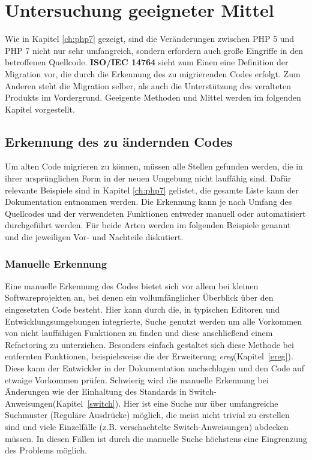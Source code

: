 \chapter{Untersuchung geeigneter Mittel}\label{ch:tools} 

Wie in Kapitel \ref{ch:php7} gezeigt, sind die Veränderungen zwischen \acs{PHP} 5 und \acs{PHP} 7 nicht nur sehr umfangreich, sondern erfordern auch große Eingriffe 
in den betroffenen Quellcode. \textbf{ISO/IEC 14764} sieht zum Einen eine Definition der Migration vor, die durch die Erkennung 
des zu migrierenden Codes erfolgt. Zum Anderen steht die Migration selber, als auch die Unterstützung des veralteten Produkts 
im Vordergrund. Geeigente Methoden und Mittel werden im folgenden Kapitel vorgestellt. 

\section{Erkennung des zu ändernden Codes}
    Um alten Code migrieren zu können, müssen alle Stellen gefunden werden, die in ihrer ursprünglichen Form in der neuen Umgebung nicht lauffähig sind. Dafür relevante
    Beispiele sind in Kapitel \ref{ch:php7} gelistet, die gesamte Liste kann der Dokumentation entnommen werden. Die Erkennung kann je nach Umfang des Quellcodes
    und der verwendeten Funktionen entweder manuell oder automatisiert durchgeführt werden. Für beide Arten werden im folgenden Beispiele genannt und die jeweiligen
    Vor- und Nachteile diskutiert.
    \subsection{Manuelle Erkennung}
        Eine manuelle Erkennung des Codes bietet sich vor allem bei kleinen Softwareprojekten an, bei denen ein vollumfänglicher Überblick über den eingesetzten Code
        besteht. Hier kann durch die, in typischen Editoren und Entwicklungsumgebungen integrierte, Suche genutzt werden um alle Vorkommen von nicht lauffähigen
        Funktionen zu finden und diese anschließend einem Refactoring zu unterziehen. Besonders einfach gestaltet sich diese Methode bei entfernten Funktionen,
        beispielsweise die der Erweiterung \textit{ereg}(Kapitel~\ref{ereg}). Diese kann der Entwickler in der Dokumentation nachschlagen und den Code auf etwaige Vorkommen prüfen.
        Schwierig wird die manuelle Erkennung bei Änderungen wie der Einhaltung des Standards in Switch-Anweisungen(Kapitel~\ref{switch}). Hier ist eine Suche nur über umfangreiche
        Suchmuster (Reguläre Ausdrücke) möglich, die meist nicht trivial zu erstellen sind und viele Einzelfälle (z.B. verschachtelte Switch-Anweisungen) abdecken müssen.
        In diesen Fällen ist durch die manuelle Suche höchstens eine Eingrenzung des Problems möglich.
